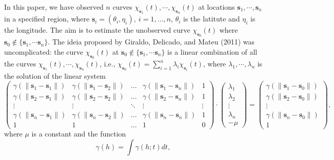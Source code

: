 \documentclass[12pt,]{article}
\theoremstyle{definition}
\theoremstyle{definition}
\theoremstyle{definition}
\theoremstyle{remark}
\begin{document}
In this paper, we have observed \(n\) curves \(\chi_{\bm{s}_1}(t), \cdots, \chi_{\bm{s}_n}(t)\) at locations \(\bm{s}_1, \cdots, \bm{s}_n\) in a specified region,
where \(\bm{s}_i = (\theta_i, \eta_i), \ i =1, \dots, n\), \(\theta_i\) is the latitute and \(\eta_i\) is the longitude. The aim is to estimate the unobserved curve
\(\chi_{\bm{s}_0}(t)\) where \(\bm{s}_0 \not\in \{\bm{s}_1, \cdots \bm{s}_n \}\). The ideia proposed by Giraldo, Delicado, and Mateu (2011) was uncomplicated:
the curve \(\chi_{\bm{s}_0}(t)\) at \(\bm{s}_0 \not\in \{\bm{s}_1, \cdots \bm{s}_n \}\) is a linear combination of all the curves \(\chi_{\bm{s}_1}(t), \cdots, \chi_{\bm{s}_n}(t)\), i.e.,
\(\chi_{\bm{s}_0}(t) = \sum_{i=1}^{n} \lambda_i \chi_{\bm{s}_i}(t)\), where \(\lambda_1, \cdots, \lambda_n\) is the solution of the linear system
\begin{equation*}
    \begin{pmatrix}
    \gamma(\lVert\bm{s}_1 - \bm{s}_1\rVert) & \gamma(\lVert\bm{s}_1 - \bm{s}_2\rVert) & \dots & \gamma(\lVert\bm{s}_{1} - \bm{s}_n\rVert) & 1\\
    \gamma(\lVert\bm{s}_2 - \bm{s}_1\rVert) & \gamma(\lVert\bm{s}_2 - \bm{s}_2\rVert) & \dots & \gamma(\lVert\bm{s}_{2} - \bm{s}_n\rVert) & 1\\
    \vdots & \vdots & \ddots & \vdots &\vdots\\
    \gamma(\lVert\bm{s}_{n} - \bm{s}_1\rVert) & \gamma(\lVert\bm{s}_{n} - \bm{s}_2\rVert) & \dots & \gamma(\lVert\bm{s}_{n} - \bm{s}_{n}\rVert) & 1\\
    1 & 1 & \dots & 1 & 0
    \end{pmatrix}
    \cdot
    \begin{pmatrix}
    \lambda_1\\
    \lambda_2\\
    \vdots\\
    \lambda_{n}\\
    -\mu
    \end{pmatrix}
    =
    \begin{pmatrix}
    \gamma(\lVert\bm{s}_1 - \bm{s}_0\rVert)\\
    \gamma(\lVert\bm{s}_2 - \bm{s}_0\rVert)\\
    \vdots\\
    \gamma(\lVert\bm{s}_{n}- \bm{s}_0\rVert)\\
    1
    \end{pmatrix},
\end{equation*}
where \(\mu\) is a constant and the function
\begin{equation} \label{eq:trace_intro}
 \gamma(h) = \int \gamma(h;t)dt,
\end{equation}
\end{document}
